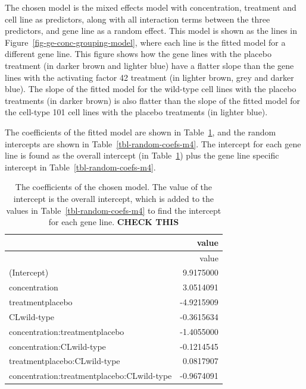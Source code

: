 \documentclass[
  letterpaper,
  DIV=11,
  numbers=noendperiod]{scrartcl}
\begin{document}
The chosen model is the mixed effects model with concentration,
treatment and cell line as predictors, along with all interaction terms
between the three predictors, and gene line as a random effect. This
model is shown as the lines in Figure~\ref{fig-ge-conc-grouping-model},
where each line is the fitted model for a different gene line. This
figure shows how the gene lines with the placebo treatment (in darker
brown and lighter blue) have a flatter slope than the gene lines with
the activating factor 42 treatment (in lighter brown, grey and darker
blue). The slope of the fitted model for the wild-type cell lines with
the placebo treatments (in darker brown) is also flatter than the slope
of the fitted model for the cell-type 101 cell lines with the placebo
treatments (in lighter blue).

The coefficients of the fitted model are shown in
Table~\ref{tbl-fixed-coefs-m4}, and the random intercepts are shown in
Table~\ref{tbl-random-coefs-m4}. The intercept for each gene line is
found as the overall intercept (in Table~\ref{tbl-fixed-coefs-m4}) plus
the gene line specific intercept in Table~\ref{tbl-random-coefs-m4}.

\hypertarget{tbl-fixed-coefs-m4}{}
\begin{longtable}[]{@{}lr@{}}
\caption{\label{tbl-fixed-coefs-m4}The coefficients of the chosen model.
The value of the intercept is the overall intercept, which is added to
the values in Table~\ref{tbl-random-coefs-m4} to find the intercept for
each gene line. \textbf{CHECK THIS}}\tabularnewline
\toprule()
& value \\
\midrule()
\endfirsthead
\toprule()
& value \\
\midrule()
\endhead
(Intercept) & 9.9175000 \\
concentration & 3.0514091 \\
treatmentplacebo & -4.9215909 \\
CLwild-type & -0.3615634 \\
concentration:treatmentplacebo & -1.4055000 \\
concentration:CLwild-type & -0.1214545 \\
treatmentplacebo:CLwild-type & 0.0817907 \\
concentration:treatmentplacebo:CLwild-type & -0.9674091 \\
\bottomrule()
\end{longtable}
\end{document}
